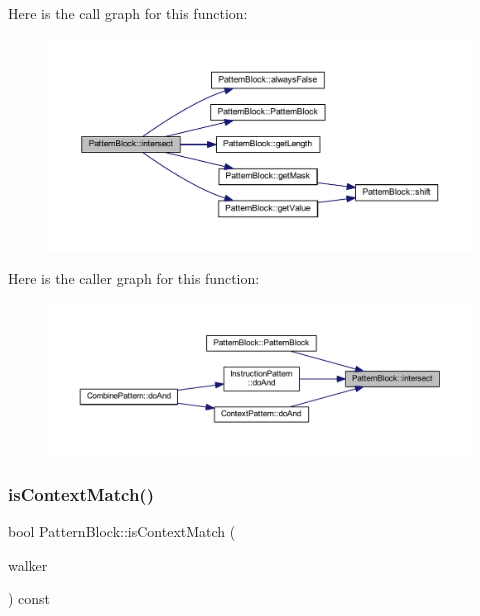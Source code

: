 Here is the call graph for this function\+:
\nopagebreak
\begin{figure}[H]
\begin{center}
\leavevmode
\includegraphics[width=350pt]{class_pattern_block_adc250100118cebc54285e1e3ea038fb3_cgraph}
\end{center}
\end{figure}
Here is the caller graph for this function\+:
\nopagebreak
\begin{figure}[H]
\begin{center}
\leavevmode
\includegraphics[width=350pt]{class_pattern_block_adc250100118cebc54285e1e3ea038fb3_icgraph}
\end{center}
\end{figure}
\mbox{\label{class_pattern_block_a3ea9defadd1e8f6a1e5744883ed9859e}} 
\subsubsection{\texorpdfstring{isContextMatch()}{isContextMatch()}}
{\footnotesize\ttfamily bool Pattern\+Block\+::is\+Context\+Match (\begin{DoxyParamCaption}\item[{\mbox{\hyperlink{class_parser_walker}{Parser\+Walker}} \&}]{walker }\end{DoxyParamCaption}) const}



